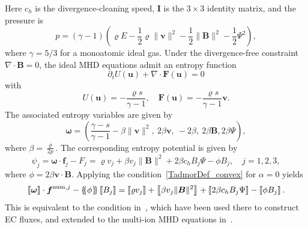 \documentclass[]{scrartcl}
\newcommand*{\ldblbrace}{\{\mskip-5mu \left \{}
\newcommand*{\rdblbrace}{ \}\mskip-5mu \right \}}
\newcommand{\mean}[1]{\left\ldblbrace #1 \right\rdblbrace}
\renewcommand{\vec}[1]{\boldsymbol{#1}}
\newcommand{\jump}[1]{\left\llbracket #1  \right\rrbracket}
\theoremstyle{definition}
\begin{document}
Here $c_h$ is the divergence-cleaning speed, $\vec{I}$ is the $3 \times 3$ identity matrix,
and the pressure is
\begin{equation}
\label{eq:pressure_mhd}
p = (\gamma - 1) \left( \varrho E - \frac{1}{2} \varrho \|\vec{v}\|^2
- \frac{1}{2} \|\vec{B}\|^2
- \frac{1}{2} \Psi^2
\right),
\end{equation}
where $\gamma = 5/3$ for a monoatomic ideal gas.
Under the divergence-free constraint $\nabla \cdot \vec{B} = 0$, the ideal MHD equations admit an entropy function~\cite{bohm2018entropy,Derigs2018420,ChandrashekarKlingenberg2016}
\begin{equation}
\partial_t U(\vec{u}) + \nabla \cdot \vec{F}(\vec{u}) = 0
\end{equation}
with
\begin{equation}
    U(\vec{u}) = -\frac{\varrho s}{\gamma -1}, \quad \vec{F}(\vec{u}) = - \frac{\varrho s}{\gamma -1} \vec{v}.
\end{equation}
The associated entropy variables are given by~\cite{ChandrashekarKlingenberg2016}
\begin{equation}
    \vec{\omega} = \left (\frac{\gamma-s}{\gamma-1}-\beta \|\vec{v}\|^2,\ 2 \beta \vec{v},\ - 2\beta,\ 2 \beta \vec{B}, 2 \beta \Psi \right ),
\end{equation}
where $\beta = \frac{\varrho}{2{p}}$. The corresponding entropy potential is given by~\cite{ChandrashekarKlingenberg2016}
\begin{equation}
\psi_j = \vec{\omega} \cdot \vec{f}_j - F_j = \varrho v_j + \beta v_j \|\vec{B}\|^2 + 2 \beta c_h B_j \Psi - \phi B_j, \quad j = 1,2,3,
\end{equation}
where $\phi = 2 \beta \vec{v} \cdot \vec{B}$.
Applying the condition~\eqref{TadmorDef_convex} for $\alpha = 0$ yields
\begin{equation}
\jump{\vec{\omega}} \cdot \vec{f}^{\mathrm{num},j} - \mean{\phi}\jump{B_j} = \jump{\varrho v_j} + \jump{\beta v_j \| \vec{B} \|^2} + \jump{2 \beta c_h B_j \Psi} - \jump{\phi B_j}.
\end{equation}
This is equivalent to the condition in~\cite[Eq. 4.41]{Derigs2018420}, which have been used there to construct EC fluxes, and extended to the multi-ion MHD equations in~\cite{rueda2025entropy}.
\end{document}
